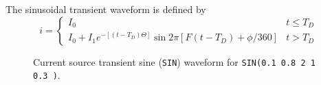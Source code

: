 The sinusoidal transient waveform is defined by
\begin{equation}
i = \left\{ \begin{array}{ll}
I_0                         & t \le T_D\\
I_0 + I_1 e^{-[\textstyle (t -T_D)\Theta]} \sin{2\pi[F(t-T_D) + \phi/360]}
                            & t > T_D
     \end{array} \right. %
\end{equation}

\begin{figure}[hbp]
\centering

\caption[Current source transient sine ({\tt SIN}) waveform]{Current source
transient sine ({\tt SIN}) waveform for\newline \hspace*{\fill}
{\tt SIN(0.1 0.8 2 1 0.3 )}.  \label{fig:isin} \hspace*{\fill} }
\end{figure}
